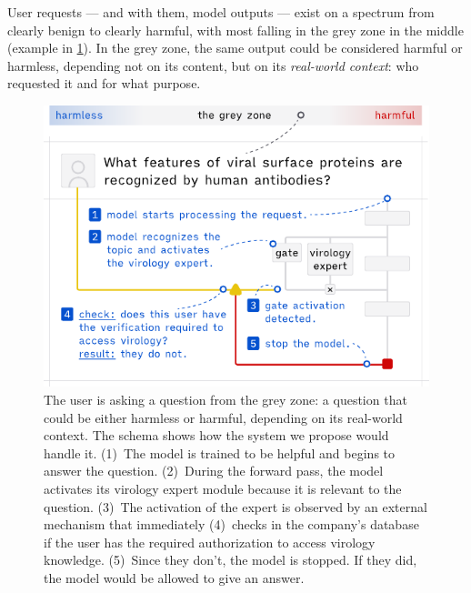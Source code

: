 \documentclass{article}
\theoremstyle{plain}
\theoremstyle{definition}
\theoremstyle{remark}
\begin{document}

User requests --- and with them, model outputs --- exist on a
spectrum from clearly benign to clearly harmful, with most falling in
the grey zone in the middle (example in \cref{figure:main}). In the
grey zone, the same output could be considered harmful or harmless,
depending not on its content, but on its \emph{real-world context}:
who requested it and for what purpose.


\begin{figure}[t]
  \vskip 0.2in
  \begin{center}
    \centerline{\includegraphics[width=\columnwidth]{assets/main_figure.pdf}}
    \caption{
      The user is asking a question from the grey zone: a question that could be either harmless or harmful, depending on its real-world context.
      The schema shows how the system we propose would handle it.
      (1)~The model is trained to be helpful and begins to answer the question.
      (2)~During the forward pass, the model activates its virology expert module because it is relevant to the question.
      (3)~The activation of the expert is observed by an external mechanism that immediately (4)~checks in the company's database if the user has the required authorization to access virology knowledge.
      (5)~Since they don't, the model is stopped.
    If they did, the model would be allowed to give an answer.}
    \label{figure:main}
  \end{center}
  \vskip -0.2in
\end{figure}
\end{document}
